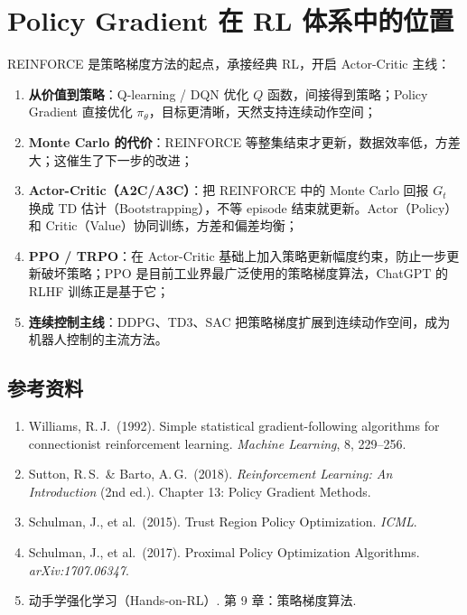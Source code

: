 \documentclass{article}
\begin{document}
\section*{Policy Gradient 在 RL 体系中的位置}

REINFORCE 是策略梯度方法的起点，承接经典 RL，开启 Actor-Critic 主线：

\begin{enumerate}
  \item \textbf{从价值到策略}：Q-learning / DQN 优化 $Q$ 函数，间接得到策略；Policy Gradient 直接优化 $\pi_\theta$，目标更清晰，天然支持连续动作空间；
  \item \textbf{Monte Carlo 的代价}：REINFORCE 等整集结束才更新，数据效率低，方差大；这催生了下一步的改进；
  \item \textbf{Actor-Critic（A2C/A3C）}：把 REINFORCE 中的 Monte Carlo 回报 $G_t$ 换成 TD 估计（Bootstrapping），不等 episode 结束就更新。Actor（Policy）和 Critic（Value）协同训练，方差和偏差均衡；
  \item \textbf{PPO / TRPO}：在 Actor-Critic 基础上加入策略更新幅度约束，防止一步更新破坏策略；PPO 是目前工业界最广泛使用的策略梯度算法，ChatGPT 的 RLHF 训练正是基于它；
  \item \textbf{连续控制主线}：DDPG、TD3、SAC 把策略梯度扩展到连续动作空间，成为机器人控制的主流方法。
\end{enumerate}

\subsection*{参考资料}

\begin{enumerate}
  \item Williams, R.\,J.\ (1992). Simple statistical gradient-following algorithms for connectionist reinforcement learning. \textit{Machine Learning}, 8, 229--256.
  \item Sutton, R.\,S.\ \& Barto, A.\,G.\ (2018). \textit{Reinforcement Learning: An Introduction} (2nd ed.). Chapter 13: Policy Gradient Methods.
  \item Schulman, J., et al.\ (2015). Trust Region Policy Optimization. \textit{ICML}.
  \item Schulman, J., et al.\ (2017). Proximal Policy Optimization Algorithms. \textit{arXiv:1707.06347}.
  \item 动手学强化学习（Hands-on-RL）. 第 9 章：策略梯度算法.
\end{enumerate}
\end{document}
